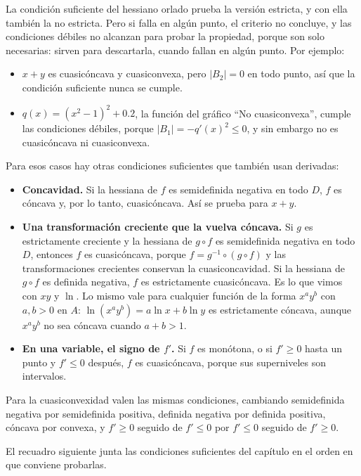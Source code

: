 \documentclass{article}
\begin{document}
La condición suficiente del hessiano orlado prueba la versión estricta, y con ella también la no estricta. Pero si falla en algún punto, el criterio no concluye, y las condiciones débiles no alcanzan para probar la propiedad, porque son solo necesarias: sirven para descartarla, cuando fallan en algún punto. Por ejemplo:
\begin{itemize}
  \item \(x+y\) es cuasicóncava y cuasiconvexa, pero \(|B_2|=0\) en todo punto, así que la condición suficiente nunca se cumple.
  \item \(q(x)=(x^2-1)^2+0.2\), la función del gráfico ``No cuasiconvexa'', cumple las condiciones débiles, porque \(|B_1|=-q'(x)^2\le0\), y sin embargo no es cuasicóncava ni cuasiconvexa.
\end{itemize}
Para esos casos hay otras condiciones suficientes que también usan derivadas:
\begin{itemize}
  \item \textbf{Concavidad.} Si la hessiana de \(f\) es semidefinida negativa en todo \(D\), \(f\) es cóncava y, por lo tanto, cuasicóncava. Así se prueba para \(x+y\).
  \item \textbf{Una transformación creciente que la vuelva cóncava.} Si \(g\) es estrictamente creciente y la hessiana de \(g\circ f\) es semidefinida negativa en todo \(D\), entonces \(f\) es cuasicóncava, porque \(f=g^{-1}\circ(g\circ f)\) y las transformaciones crecientes conservan la cuasiconcavidad. Si la hessiana de \(g\circ f\) es definida negativa, \(f\) es estrictamente cuasicóncava. Es lo que vimos con \(xy\) y \(\ln\). Lo mismo vale para cualquier función de la forma \(x^a y^b\) con \(a,b>0\) en \(A\): \(\ln(x^a y^b)=a\ln x+b\ln y\) es estrictamente cóncava, aunque \(x^a y^b\) no sea cóncava cuando \(a+b>1\).
  \item \textbf{En una variable, el signo de \(f'\).} Si \(f\) es monótona, o si \(f'\ge0\) hasta un punto y \(f'\le0\) después, \(f\) es cuasicóncava, porque sus superniveles son intervalos.
\end{itemize}
Para la cuasiconvexidad valen las mismas condiciones, cambiando semidefinida negativa por semidefinida positiva, definida negativa por definida positiva, cóncava por convexa, y \(f'\ge0\) seguido de \(f'\le0\) por \(f'\le0\) seguido de \(f'\ge0\).

El recuadro siguiente junta las condiciones suficientes del capítulo en el orden en que conviene probarlas.
\end{document}
